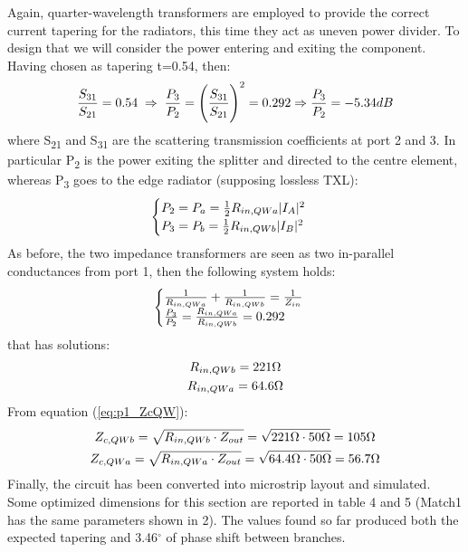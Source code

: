 Again, quarter-wavelength transformers are employed to provide the correct current tapering for the radiators, this time they act as uneven power divider. To design that we will consider the power entering and exiting the component.
Having chosen as tapering t=0.54, then:
\begin{equation}
	\frac{S_{31}}{S_{21}}=0.54 \; \Rightarrow \; \frac{P_3}{P_2}=\Bigg(\frac{S_{31}}{S_{21}}\Bigg)^2=0.292 \Rightarrow \frac{P_3}{P_2}=-5.34dB \notag
\end{equation} 
where S\textsubscript{21} and S\textsubscript{31} are the scattering transmission coefficients at port 2 and 3. In particular P\textsubscript{2} is the power exiting the splitter and directed to the centre element, whereas P\textsubscript{3} goes to the edge radiator (supposing lossless TXL):
\begin{equation}
	\begin{cases}
		P_2 = P_a = \frac{1}{2}R_{in,QWa}|I_A|^2 \notag \\	
		P_3 = P_b = \frac{1}{2}R_{in,QWb}|I_B|^2 \notag	
	\end{cases}	
\end{equation}
As before, the two impedance transformers are seen as two in-parallel conductances from port 1, then the following system holds: 
\begin{equation}
	\begin{cases} 
		\frac{1}{R_{in,QWa}}+\frac{1}{R_{in,QWb}}=\frac{1}{Z_{in}} \notag\\
		\frac{P_{3}}{P_{2}}=\frac{R_{in,QWa}}{R_{in,QWb}}=0.292 \notag
	\end{cases}
\end{equation}
that has solutions:
\begin{gather}
	R_{in,QWb} = 221\Omega \notag \\
	R_{in,QWa} = 64.6\Omega \notag
\end{gather}
From equation (\ref{eq:p1_ZcQW}):
\begin{gather}
	Z_{c,QWb}=\sqrt{R_{in,QWb}\cdot Z_{out}}=\sqrt{221\Omega \cdot 50\Omega}=105\Omega \notag \\
	Z_{c,QWa}=\sqrt{R_{in,QWa}\cdot Z_{out}}=\sqrt{64.4\Omega \cdot 50\Omega}=56.7\Omega \notag
\end{gather}
Finally, the circuit has been converted into microstrip layout and simulated. Some optimized dimensions for this section are reported in table 4 and 5 (Match1 has the same parameters shown in 2).
The values found so far produced both the expected tapering  and 3.46$^\circ$ of phase shift between branches.
